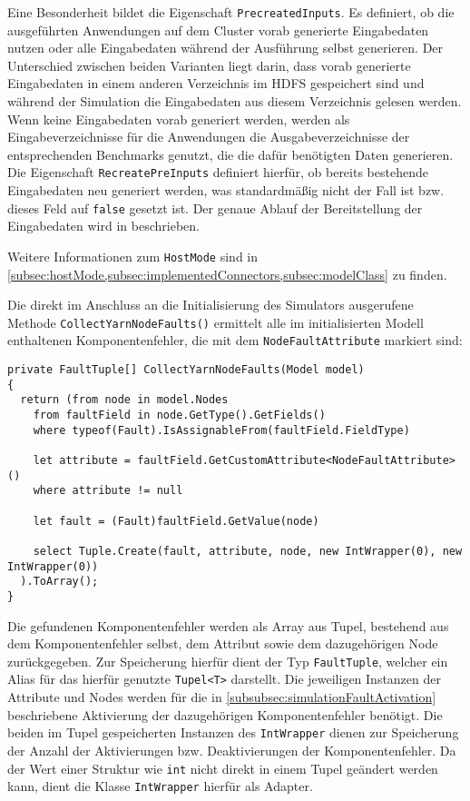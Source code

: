 Eine Besonderheit bildet die Eigenschaft \texttt{PrecreatedInputs}.
Es definiert, ob die ausgeführten Anwendungen auf dem Cluster vorab generierte Eingabedaten nutzen oder alle Eingabedaten während der Ausführung selbst generieren.
Der Unterschied zwischen beiden Varianten liegt darin, dass vorab generierte Eingabedaten in einem anderen Verzeichnis im \ac{HDFS} gespeichert sind und während der Simulation die Eingabedaten aus diesem Verzeichnis gelesen werden.
Wenn keine Eingabedaten vorab generiert werden, werden als Eingabeverzeichnisse für die Anwendungen die Ausgabeverzeichnisse der entsprechenden Benchmarks genutzt, die die dafür benötigten Daten generieren.
Die Eigenschaft \texttt{RecreatePreInputs} definiert hierfür, ob bereits bestehende Eingabedaten neu generiert werden, was standardmäßig nicht der Fall ist bzw. dieses Feld auf \texttt{false} gesetzt ist.
Der genaue Ablauf der Bereitstellung der Eingabedaten wird in  beschrieben.

Weitere Informationen zum \texttt{HostMode} sind in \cref{subsec:hostMode,subsec:implementedConnectors,subsec:modelClass} zu finden.

Die direkt im Anschluss an die Initialisierung des Simulators ausgerufene Methode \texttt{CollectYarnNodeFaults()} ermittelt alle im initialisierten Modell enthaltenen Komponentenfehler, die mit dem \texttt{NodeFaultAttribute} markiert sind:

\begin{lstlisting}[label=lst:hadoopSimulationCollectFaults,style=cs,
caption={[Ermitteln der Komponentenfehler mit dem NodeFaultAttribute]
    Ermitteln der Komponentenfehler mit dem \texttt{NodeFaultAttribute}}]
private FaultTuple[] CollectYarnNodeFaults(Model model)
{
  return (from node in model.Nodes      
    from faultField in node.GetType().GetFields()
    where typeof(Fault).IsAssignableFrom(faultField.FieldType)
    
    let attribute = faultField.GetCustomAttribute<NodeFaultAttribute>()
    where attribute != null
    
    let fault = (Fault)faultField.GetValue(node)
    
    select Tuple.Create(fault, attribute, node, new IntWrapper(0), new IntWrapper(0))
  ).ToArray();
}
\end{lstlisting}

Die gefundenen Komponentenfehler werden als Array aus Tupel, bestehend aus dem Komponentenfehler selbst, dem Attribut sowie dem dazugehörigen Node zurückgegeben.
Zur Speicherung hierfür dient der Typ \texttt{FaultTuple}, welcher ein Alias für das hierfür genutzte \texttt{Tupel<T>} darstellt.
Die jeweiligen Instanzen der Attribute und Nodes werden für die in \cref{subsubsec:simulationFaultActivation} beschriebene Aktivierung der dazugehörigen Komponentenfehler benötigt.
Die beiden im Tupel gespeicherten Instanzen des \texttt{IntWrapper} dienen zur Speicherung der Anzahl der Aktivierungen bzw. Deaktivierungen der Komponentenfehler.
Da der Wert einer Struktur wie \texttt{int} nicht direkt in einem Tupel geändert werden kann, dient die Klasse \texttt{IntWrapper} hierfür als Adapter.


